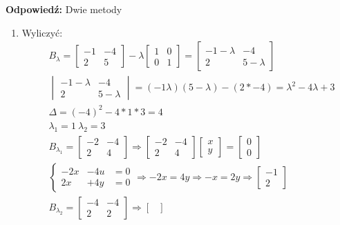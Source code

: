 \documentclass[a4paper,12pt]{article}
\theoremstyle{definition}%
\theoremstyle{definition}
\theoremstyle{problem}
\begin{document}
\begin{enumerate}[label=\alph*)]
\textbf{Odpowiedź: } Dwie metody  
\begin{enumerate}[label=\Roman*:]
\item Wyliczyć:
\begin{align*}
&B_\lambda = \begin{bmatrix}
-1 & -4\\ 2 & 5
\end{bmatrix} - \lambda \begin{bmatrix}
1&0\\0&1
\end{bmatrix}=\begin{bmatrix}
-1-\lambda&-4\\
2&5-\lambda
\end{bmatrix}\\
&\begin{vmatrix}
-1-\lambda&-4\\
2&5-\lambda
\end{vmatrix}=(-1\lambda )(5-\lambda )-(2*-4)=\lambda ^2-4\lambda +3\\
&\Delta = (-4)^2-4*1*3=4\\
&\lambda _1 = 1\ \lambda _2 =3\\
&B_{\lambda _1}= \begin{bmatrix}
-2 & -4\\ 2 & 4
\end{bmatrix} \Rightarrow \begin{bmatrix}
-2 & -4\\ 2 & 4
\end{bmatrix} \begin{bmatrix}
x\\y
\end{bmatrix}=\begin{bmatrix}
0\\0
\end{bmatrix}\\
&\left\{\begin{matrix}
-2x &-4u &= 0\\
2x &+ 4y &= 0
\end{matrix}\right. \Rightarrow -2x = 4y\Rightarrow -x=2y \Rightarrow \begin{bmatrix}
-1 \\2
\end{bmatrix}\\
&B_{\lambda _2}= \begin{bmatrix}
-4 & -4\\ 2 & 2
\end{bmatrix} \Rightarrow \begin{bmatrix}

\end{bmatrix}
\end{align*}
\end{enumerate}
\end{enumerate}
\end{document}
